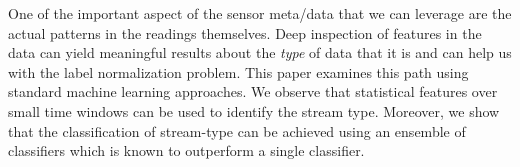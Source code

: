 One of the important aspect of the sensor meta/data that we can leverage are the actual patterns in the readings themselves.
Deep inspection of features in the data can yield meaningful results about the \emph{type} of data that it is
and can help us with the label normalization problem.  This paper examines this path using standard machine learning
approaches.  We observe that statistical features over small time windows can be used to identify the stream type.
Moreover, we show that the classification of stream-type can be achieved using an ensemble of classifiers which is
known to outperform a single classifier.





